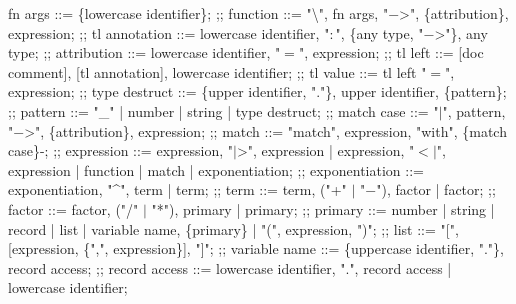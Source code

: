 \begin{bnfgrammar}
    fn args ::= \{lowercase identifier\};
    ;;
    function ::= "\textbackslash", fn args, "$-$>", \{attribution\}, expression;
    ;;
    tl annotation ::= lowercase identifier, "$\colon$", \{any type, "$-$>"\}, any type;
    ;;
    attribution ::= lowercase identifier, "$=$", expression;
    ;;
    tl left ::= [doc comment], [tl annotation], lowercase identifier;
    ;;
    tl value ::= tl left "$=$", expression;
    ;;
    type destruct ::= \{upper identifier, "."\}, upper identifier, \{pattern\};
    ;;
    pattern ::= "\_"
    | number
    | string
    | type destruct;
    ;;
    match case ::= "$\vert$", pattern, "$-$>", \{attribution\}, expression;
    ;;
    match ::= "match", expression, "with", \{match case\}-;
    ;;
    expression ::= expression, "$\vert$>", expression
    | expression, "$<$$\vert$", expression
        | function
        | match
        | exponentiation;
        ;;
        exponentiation ::= exponentiation, "\textasciicircum", term
        | term;
        ;;
        term ::= term, ("+" $\vert$ "$-$"), factor
        | factor;
        ;;
        factor ::= factor, ("\slash" $\vert$ "*"), primary
    | primary;
    ;;
    primary ::= number
    | string
    | record
    | list
    | variable name, \{primary\}
    | "(", expression, ")";
    ;;
    list ::= "[", [expression, \{",", expression\}], "]";
    ;;
    variable name ::= \{uppercase identifier, "."\}, record access;
    ;;
    record access ::= lowercase identifier, ".", record access
    | lowercase identifier;
\end{bnfgrammar}
